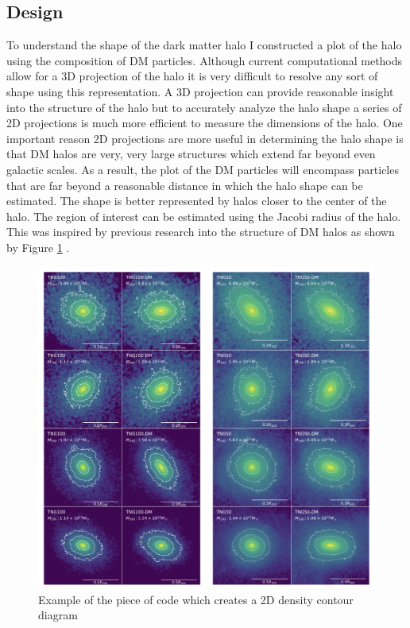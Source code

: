 \documentclass[usenatbib]{mnras}
\begin{document}
\subsection{Design}
To understand the shape of the dark matter halo I constructed a plot of the halo using the composition of DM particles. Although current computational methods allow for a 3D projection of the halo it is very difficult to resolve any sort of shape using this representation. A 3D projection can provide reasonable insight into the structure of the halo but to accurately analyze the halo shape a series of 2D projections is much more efficient to measure the dimensions of the halo. One important reason 2D projections are more useful in determining the halo shape is that DM halos are very, very large structures which extend far beyond even galactic scales. As a result, the plot of the DM particles will encompass particles that are far beyond a reasonable distance in which the halo shape can be estimated. The shape is better represented by halos closer to the center of the halo. The region of interest can be estimated using the Jacobi radius of the halo. This was inspired by previous research into the structure of DM halos as shown by Figure \ref{fig:density_code} \citep{Chua22}.
\begin{figure}
	\includegraphics[width=\columnwidth]{density_countours.png}
    \caption{Example of the piece of code which creates a 2D density contour diagram}
    \label{fig:density_code}
\end{figure}
\end{document}
